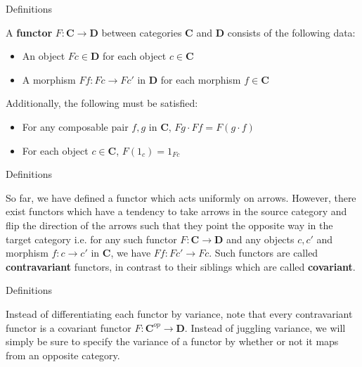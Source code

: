 \documentclass[tikz]{beamer}
\theoremstyle{definition}
\begin{document}
\begin{frame}{Definitions}

    \begin{definition}[Functor]
        A \textbf{functor} $F: \mathbf{C} \to \mathbf{D}$ between categories $\mathbf{C}$ and $\mathbf{D}$ consists of the following data:

        \begin{itemize}
            \item An object $Fc \in \mathbf{D}$ for each object $c \in \mathbf{C}$
            \item A morphism $Ff: Fc \to Fc'$ in \textbf{D} for each morphism $f \in \mathbf{C}$
        \end{itemize}{}
    \end{definition}{}

Additionally, the following must be satisfied:
\begin{itemize}
    \item For any composable pair $f, g$ in $\mathbf{C}$, $Fg \cdot Ff = F(g \cdot f)$

    \item For each object $c \in \mathbf{C}$, $F(1_c) = 1_{Fc}$
\end{itemize}
\end{frame}

\begin{frame}{Definitions}

So far, we have defined a functor which acts uniformly on arrows. However, there exist functors which have a tendency to take arrows in the source category and flip the direction of the arrows such that they point the opposite way in the target category i.e. for any such functor $F: \mathbf{C} \to \mathbf{D}$ and any objects $c, c'$ and morphism $f: c \to c'$ in \textbf{C}, we have $Ff: Fc' \to Fc$. Such functors are called \textbf{contravariant} functors, in contrast to their siblings which are called \textbf{covariant}.

\end{frame}

\begin{frame}{Definitions}

Instead of differentiating each functor by variance, note that every contravariant functor is a covariant functor $F: \mathbf{C}^{op} \to \mathbf{D}$. Instead of juggling variance, we will simply be sure to specify the variance of a functor by whether or not it maps from an opposite category.

\end{frame}
\end{document}
